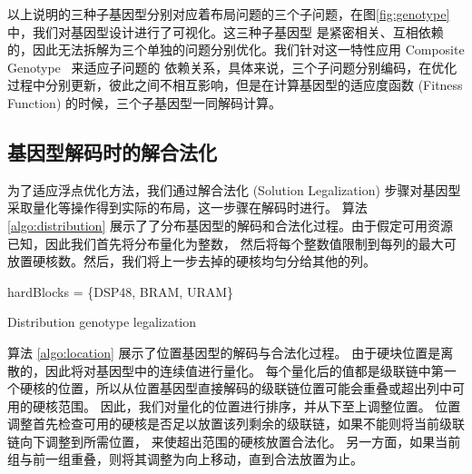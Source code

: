 以上说明的三种子基因型分别对应着布局问题的三个子问题，在图\ref{fig:genotype}中，我们对基因型设计进行了可视化。这三种子基因型
是紧密相关、互相依赖的，因此无法拆解为三个单独的问题分别优化。我们针对这一特性应用 Composite Genotype~\cite{opt4jpaper} 来适应子问题的
依赖关系，具体来说，三个子问题分别编码，在优化过程中分别更新，彼此之间不相互影响，但是在计算基因型的适应度函数 (Fitness Function)
的时候，三个子基因型一同解码计算。


\subsection{基因型解码时的解合法化}

为了适应浮点优化方法，我们通过解合法化 (Solution Legalization) 步骤对基因型采取量化等操作得到实际的布局，这一步骤在解码时进行。
算法 \ref{algo:distribution} 展示了了分布基因型的解码和合法化过程。由于假定可用资源已知，因此我们首先将分布量化为整数，
然后将每个整数值限制到每列的最大可放置硬核数。然后，我们将上一步去掉的硬核均匀分给其他的列。

\begin{algorithm}
	
	hardBlocks = \{DSP48, BRAM, URAM\}\;

	\caption{Distribution genotype legalization}
	\label{algo:distribution}
\end{algorithm}

算法 \ref{algo:location} 展示了位置基因型的解码与合法化过程。
由于硬块位置是离散的，因此将对基因型中的连续值进行量化。
每个量化后的值都是级联链中第一个硬核的位置，所以从位置基因型直接解码的级联链位置可能会重叠或超出列中可用的硬核范围。
因此，我们对量化的位置进行排序，并从下至上调整位置。
位置调整首先检查可用的硬核是否足以放置该列剩余的级联链，如果不能则将当前级联链向下调整到所需位置，
来使超出范围的硬核放置合法化。
另一方面，如果当前组与前一组重叠，则将其调整为向上移动，直到合法放置为止。

